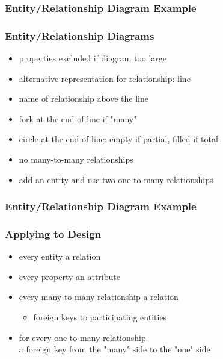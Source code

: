 \documentclass[dvipsnames]{beamer}
\begin{document}
\begin{frame}
  \frametitle{Entity/Relationship Diagram Example}

  \begin{center}
  \end{center}
\end{frame}

\begin{frame}
  \frametitle{Entity/Relationship Diagrams}

  \begin{itemize}
    \item properties excluded if diagram too large

    \bigskip
    \item alternative representation for relationship: line
    \item name of relationship above the line
    \item fork at the end of line if "many"
    \item circle at the end of line: empty if partial, filled if total

    \medskip
    \item no many-to-many relationships
    \item add an entity and use two one-to-many relationships
 \end{itemize}
\end{frame}

\begin{frame}
  \frametitle{Entity/Relationship Diagram Example}

  \begin{center}
  \end{center}
\end{frame}

\begin{frame}
  \frametitle{Applying to Design}

  \begin{itemize}
    \item every entity a relation

    \pause
    \item every property an attribute

    \pause
    \item every many-to-many relationship a relation
    \begin{itemize}
      \item foreign keys to participating entities
    \end{itemize}

    \pause
    \item for every one-to-many relationship\\
      a foreign key from the "many" side to the "one" side
 \end{itemize}
\end{frame}
\end{document}
